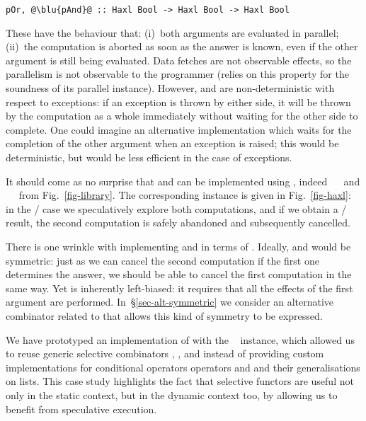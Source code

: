 \begin{verbatim}
pOr, @\blu{pAnd}@ :: Haxl Bool -> Haxl Bool -> Haxl Bool
\end{verbatim}

\noindent
These have the behaviour that: (i)~both arguments are evaluated in parallel;
(ii)~the computation is aborted as soon as the answer is known, even if the
other argument is still being evaluated. Data fetches are not observable
effects, so the parallelism is not observable to the programmer (\Haxl relies
on this property for the soundness of its parallel 
instance). However,  and  are non-deterministic with
respect to exceptions: if an exception is thrown by either side, it
will be thrown by the computation as a whole immediately without
waiting for the other side to complete.  One could imagine an
alternative implementation which waits for the completion of the other
argument when an exception is raised; this would be deterministic, but
would be less efficient in the case of exceptions.

It should come as no surprise that  and  can be
implemented using , indeed ~\hs{=}~\hs{(<||>)} and
~\hs{=}~\hs{(<&&>)} from Fig.~\ref{fig-library}. The corresponding
 instance is given in Fig.~\ref{fig-haxl}: in the
/ case we speculatively explore both computations,
and if we obtain a / result, the second computation is
safely abandoned and subsequently cancelled.

There is one wrinkle with implementing  and 
in terms of . Ideally,  and  would be
symmetric: just as we can cancel the second computation if the first
one determines the answer, we should be able to cancel the first
computation in the same way. Yet  is inherently left-biased:
it requires that all the effects of the first argument are performed.
In~\S\ref{sec-alt-symmetric} we consider an alternative combinator
related to  that allows this kind of symmetry to be expressed.

We have prototyped an implementation of \Haxl with the ~
instance, which allowed us to reuse generic selective combinators
\hs{<||>}, \hs{<&&>},  and  instead of providing custom
implementations for conditional operators operators  and  and
their generalisations on lists. This case study highlights the fact that
selective functors are useful not only in the static context, but in the dynamic
context too, by allowing us to benefit from speculative execution.

